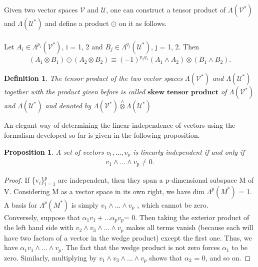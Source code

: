 \documentclass[12pt,a4paper]{article}
\newtheorem{defn}[thm]{Definition}
\newtheorem{prop}{Proposition}
\begin{document}
\indent Given two vector spaces $\mathcal{V}$ and $\mathcal{U}$, one can construct a tensor product
of $\Lambda(\mathcal{V}^*)$ and $\Lambda(\mathcal{U}^*)$ and define a product $\odot$ on it as follows.\\\\ Let $A_i \in \Lambda^{p_i}(\mathcal{V}^*)$, i = 1, 2 and  $B_j \in \Lambda^{q_j}(\mathcal{U}^*)$, j = 1, 2. Then \\
\begin{align*}
(A_1 \otimes B_1) \odot (A_2 \otimes B_2) \equiv (-1)^{p_2 q_1}(A_1 \wedge A_2) \otimes ( B_1 \wedge B_2). 
\end{align*}
\begin{defn}
The tensor product of the two vector spaces $\Lambda(\mathcal{V}^*)$ and $\Lambda(\mathcal{U}^*)$ together with the product given before is called $\textbf{skew tensor product}$ of  $\Lambda(\mathcal{V}^*)$ and $\Lambda(\mathcal{U}^*)$ and denoted by  $\Lambda(\mathcal{V}^*) \overset{\wedge}{\otimes} \Lambda(\mathcal{U}^*)$
\end{defn}
An elegant way of determining the linear independence of vectors using
the formalism developed so far is given in the following proposition.\\
\begin{prop}\label{prop1}
A set of vectors v$_1,...,v_p$ is linearly independent if
and only if
\begin{align*} 
v_1 \wedge ... \wedge v_p \ne 0.
\end{align*}
\end{prop}
\begin{proof}
If \{v$_i$\}$^p_{i=1}$ are independent, then they span a p-dimensional subspace M of V. Considering M as a vector space in its own right, we have
dim  $\Lambda^{p}(M^*)$ = 1. A basis for $\Lambda^{p}(M^*)$ is simply $v_1 \wedge ... \wedge v_p$ , which cannot
be zero. \\
\indent Conversely, suppose that $\alpha_1 v_1 + ... \alpha_p v_p $= 0. Then taking the exterior
product of the left hand side with $v_2 \wedge v_3 \wedge ... \wedge v_p$ makes all terms vanish (because
each will have two factors of a vector in the wedge product) except the first
one. Thus, we have $\alpha_1 v_1 \wedge ... \wedge v_p $.  The fact that the wedge product is
not zero forces $\alpha_1$ to be zero. Similarly, multiplying by $v_1 \wedge v_3 \wedge ... \wedge v_p$ shows that $\alpha_2$ = 0, and so on.
\end{proof}
\end{document}
